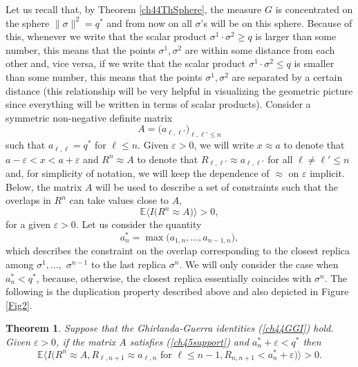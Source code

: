 \documentclass[12pt]{article}
\newcommand{\eps}{{\varepsilon}}
\newcommand{\e}{\mathbb{E}}
\newcommand{\la}{\langle}
\newcommand{\ra}{\rangle}
\newtheorem{theorem}{Theorem}
\theoremstyle{nonumberplain}
\begin{document}
Let us recall that, by Theorem \ref{ch44ThSphere}, the measure $G$ is concentrated on the sphere $\|\sigma\|^2 = q^*$ and from now on all $\sigma$'s will be on this sphere. Because of this, whenever we write that the scalar product $\sigma^1\cdot\sigma^2 \geq q$ is larger than some number, this means that the points $\sigma^1,\sigma^2$ are within some distance from each other and, vice versa, if we write that the scalar product $\sigma^1\cdot\sigma^2 \leq q$ is smaller than some number, this means that the points $\sigma^1,\sigma^2$ are separated by a certain distance (this relationship will be very helpful in visualizing the geometric picture since everything will be written in terms of scalar products). Consider a symmetric non-negative definite matrix 
\begin{equation}
A=\bigl(a_{\ell,\ell'}\bigr)_{\ell,\ell'\leq n}
\end{equation}
such that $a_{\ell,\ell} = q^*$ for $\ell\leq n$.
Given $\eps>0$, we will write $x\approx a$ to denote that $a-\eps<x<a+\eps$ and $R^n\approx A$ to denote that 
$R_{\ell,\ell'} \approx a_{\ell,\ell'}$ for all $\ell\not = \ell' \leq n$ and, for simplicity of notation, we will keep the dependence of $\approx$ on $\eps$ implicit.
Below, the matrix $A$ will be used to describe a set of constraints such that the overlaps in $R^n$ can take values close to $A$, 
\begin{equation}
\e\bigl\la I\bigl(R^n \approx A\bigr)\bigr\ra >0,
\label{ch45support}
\end{equation}
for a given $\eps>0$. Let us consider the quantity 
\begin{equation}
a_n^* = \max \bigl(a_{1,n},\ldots, a_{n-1,n}\bigr),
\end{equation}
which describes the constraint on the overlap corresponding to the closest replica among $\sigma^1,\ldots,$ $\sigma^{n-1}$ to the last replica $\sigma^n$. We will only consider the case when $a_n^*<q^*$, because, otherwise, the closest replica essentially coincides with $\sigma^n$. The following is the duplication property described above and also depicted in Figure \ref{Fig2}.
\begin{theorem} \label{ch45ThObs} Suppose that the Ghirlanda-Guerra identities (\ref{ch44GGI}) hold. Given $\eps>0$, if the matrix $A$ satisfies (\ref{ch45support}) and $a_n^* +\eps < q^*$ then
\begin{equation}
\e\bigl\la
I \bigl(
R^n\approx A, R_{\ell,n+1} \approx a_{\ell,n} \mbox{ for }\ell\leq n-1, R_{n,n+1} < a_n^* +\eps
\bigr)
\bigr\ra
>0.
\label{ch45extend}
\end{equation}
\end{theorem}\noindent
\end{document}

